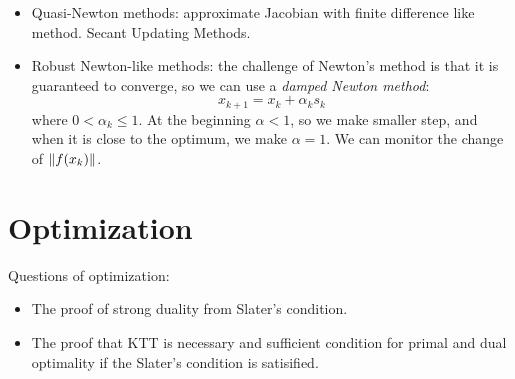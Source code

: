 \documentclass{report}
\begin{document}
\begin{itemize}
	\item Quasi-Newton methods: approximate Jacobian with finite difference like method. Secant Updating Methods. 
	
	\item Robust Newton-like methods: the challenge of Newton's method is that it is guaranteed to converge, so we can use a \textit{damped Newton method}: 
	\begin{equation}
	x_{k+1} = x_k + \alpha_k s_k
	\end{equation}
	where $0 < \alpha_k \leq 1$. At the beginning $\alpha< 1$, so we make smaller step, and when it is close to the optimum, we make $\alpha = 1$. We can monitor the change of $\lVert f(x_k)\rVert$.
\end{itemize}
\section{Optimization}

Questions of optimization: 
\begin{itemize}
\item The proof of strong duality from Slater's condition. 
\item The proof that KTT is necessary and sufficient condition for primal and dual optimality if the Slater's condition is satisified. 
\end{itemize}
\end{document}
